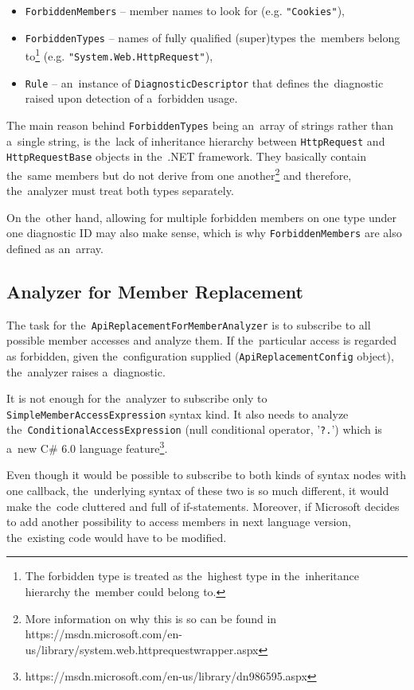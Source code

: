 \documentclass[
  digital, %
  table,   %
  lof,     %
  lot,     %
  oneside,
]{fithesis3}
\begin{document}
\begin{itemize}
  \item \texttt{ForbiddenMembers} -- member names to look for (e.g. \texttt{"Cookies"}), 
  \item \texttt{ForbiddenTypes} -- names of fully qualified (super)types the~members belong to\footnote{The forbidden type is treated as the~highest type in the~inheritance hierarchy the~member could belong to.
} (e.g. \texttt{"System.Web.HttpRequest"}), 
  \item \texttt{Rule} -- an~instance of \texttt{DiagnosticDescriptor} that defines the~diagnostic raised upon detection of a~forbidden usage.
\end{itemize} 

The main reason behind \texttt{ForbiddenTypes} being an~array of strings rather than a~single string, is the~lack of inheritance hierarchy between \texttt{HttpRequest} and \texttt{HttpRequestBase} objects in the~.NET framework. They basically contain the~same members but do not derive from one another\footnote{More information on why this is so can be found in https://msdn.microsoft.com/en-us/library/system.web.httprequestwrapper.aspx} and therefore, the~analyzer must treat both types separately. 

On the~other hand, allowing for multiple forbidden members on one type under one diagnostic ID may also make sense, which is why \texttt{ForbiddenMembers} are also defined as an~array.

\subsection{Analyzer for Member Replacement}
The task for the~\texttt{ApiReplacementForMemberAnalyzer} is to subscribe to all possible member accesses and analyze them. If the~particular access is regarded as forbidden, given the~configuration supplied (\texttt{ApiReplacementConfig} object), the~analyzer raises a~diagnostic.

It is not enough for the~analyzer to subscribe only to \texttt{SimpleMemberAccessExpression} syntax kind. It also needs to analyze the~\texttt{ConditionalAccessExpression} (null conditional operator, '\texttt{?.}') which is a~new C\# 6.0 language feature\footnote{https://msdn.microsoft.com/en-us/library/dn986595.aspx}. 

Even though it would be possible to subscribe to both kinds of syntax nodes with one callback, the~underlying syntax of these two is so much different, it would make the~code cluttered and full of if-statements. Moreover, if Microsoft decides to add another possibility to access members in next language version, the~existing code would have to be modified.
\end{document}

